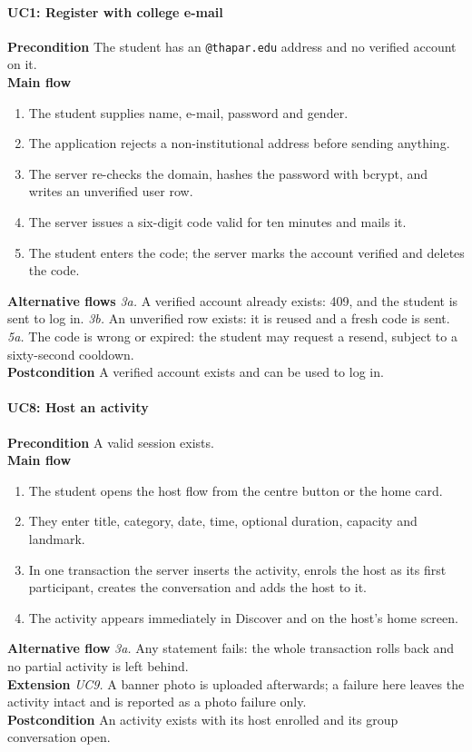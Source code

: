 \documentclass{tietreport}
\begin{document}
\paragraph{UC1: Register with college e-mail}
\textbf{Precondition} The student has an \texttt{@thapar.edu} address and no verified
account on it.\\
\textbf{Main flow}
\begin{enumerate}[nosep]
  \item The student supplies name, e-mail, password and gender.
  \item The application rejects a non-institutional address before sending anything.
  \item The server re-checks the domain, hashes the password with bcrypt, and writes an
        unverified user row.
  \item The server issues a six-digit code valid for ten minutes and mails it.
  \item The student enters the code; the server marks the account verified and deletes
        the code.
\end{enumerate}
\textbf{Alternative flows} \emph{3a.} A verified account already exists: 409, and the
student is sent to log in. \emph{3b.} An unverified row exists: it is reused and a fresh
code is sent. \emph{5a.} The code is wrong or expired: the student may request a resend,
subject to a sixty-second cooldown.\\
\textbf{Postcondition} A verified account exists and can be used to log in.

\paragraph{UC8: Host an activity}
\textbf{Precondition} A valid session exists.\\
\textbf{Main flow}
\begin{enumerate}[nosep]
  \item The student opens the host flow from the centre button or the home card.
  \item They enter title, category, date, time, optional duration, capacity and landmark.
  \item In one transaction the server inserts the activity, enrols the host as its first
        participant, creates the conversation and adds the host to it.
  \item The activity appears immediately in Discover and on the host's home screen.
\end{enumerate}
\textbf{Alternative flow} \emph{3a.} Any statement fails: the whole transaction rolls
back and no partial activity is left behind.\\
\textbf{Extension} \emph{UC9.} A banner photo is uploaded afterwards; a failure here
leaves the activity intact and is reported as a photo failure only.\\
\textbf{Postcondition} An activity exists with its host enrolled and its group
conversation open.
\end{document}
